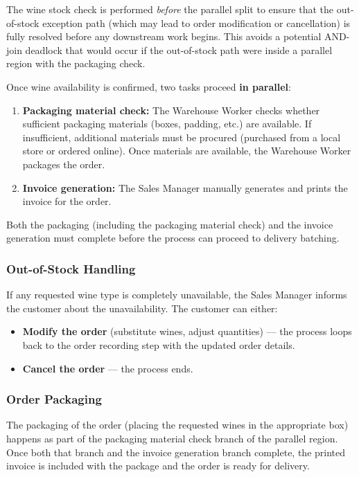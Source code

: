 \documentclass[11pt,a4paper]{article}
\begin{document}
The wine stock check is performed \emph{before} the parallel split to ensure that the out-of-stock exception path (which may lead to order modification or cancellation) is fully resolved before any downstream work begins. This avoids a potential AND-join deadlock that would occur if the out-of-stock path were inside a parallel region with the packaging check.

Once wine availability is confirmed, two tasks proceed \textbf{in parallel}:
\begin{enumerate}[leftmargin=*]
    \item \textbf{Packaging material check:} The Warehouse Worker checks whether sufficient packaging materials (boxes, padding, etc.) are available. If insufficient, additional materials must be procured (purchased from a local store or ordered online). Once materials are available, the Warehouse Worker packages the order.
    \item \textbf{Invoice generation:} The Sales Manager manually generates and prints the invoice for the order.
\end{enumerate}

Both the packaging (including the packaging material check) and the invoice generation must complete before the process can proceed to delivery batching.

\subsubsection{Out-of-Stock Handling}

If any requested wine type is completely unavailable, the Sales Manager informs the customer about the unavailability. The customer can either:
\begin{itemize}
    \item \textbf{Modify the order} (substitute wines, adjust quantities) --- the process loops back to the order recording step with the updated order details.
    \item \textbf{Cancel the order} --- the process ends.
\end{itemize}

\subsubsection{Order Packaging}

The packaging of the order (placing the requested wines in the appropriate box) happens as part of the packaging material check branch of the parallel region. Once both that branch and the invoice generation branch complete, the printed invoice is included with the package and the order is ready for delivery.
\end{document}

